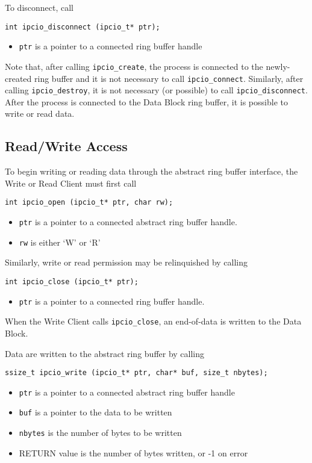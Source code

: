 To disconnect, call
\begin{verbatim}
int ipcio_disconnect (ipcio_t* ptr);
\end{verbatim}
\vspace{-6mm}
\begin{itemize}
\item {\tt ptr} is a pointer to a connected ring buffer handle
\end{itemize}
Note that, after calling {\tt ipcio\_create}, the process is connected
to the newly-created ring buffer and it is not necessary to call 
{\tt ipcio\_connect}.  Similarly, after calling {\tt ipcio\_destroy},
it is not necessary (or possible) to call {\tt ipcio\_disconnect}.
After the process is connected to the Data Block ring buffer, it is
possible to write or read data.

\subsection{Read/Write Access}

To begin writing or reading data through the abstract ring buffer interface,
the Write or Read Client must first call
\begin{verbatim}
int ipcio_open (ipcio_t* ptr, char rw);
\end{verbatim}
\vspace{-6mm}
\begin{itemize}
\item {\tt ptr} is a pointer to a connected abstract ring buffer handle.
\vspace{-2mm}
\item {\tt rw} is either `W' or `R'
\end{itemize}
Similarly, write or read permission may be relinquished by calling
\begin{verbatim}
int ipcio_close (ipcio_t* ptr);
\end{verbatim}
\vspace{-6mm}
\begin{itemize}
\item {\tt ptr} is a pointer to a connected ring buffer handle.
\end{itemize}
When the Write Client calls {\tt ipcio\_close}, an end-of-data is written
to the Data Block.

Data are written to the abstract ring buffer by calling
\begin{verbatim}
ssize_t ipcio_write (ipcio_t* ptr, char* buf, size_t nbytes);
\end{verbatim}
\vspace{-6mm}
\begin{itemize}
\item {\tt ptr} is a pointer to a connected abstract ring buffer handle
\vspace{-2mm}
\item {\tt buf} is a pointer to the data to be written
\vspace{-2mm}
\item {\tt nbytes} is the number of bytes to be written
\vspace{-2mm}
\item RETURN value is the number of bytes written, or -1 on error
\end{itemize}

